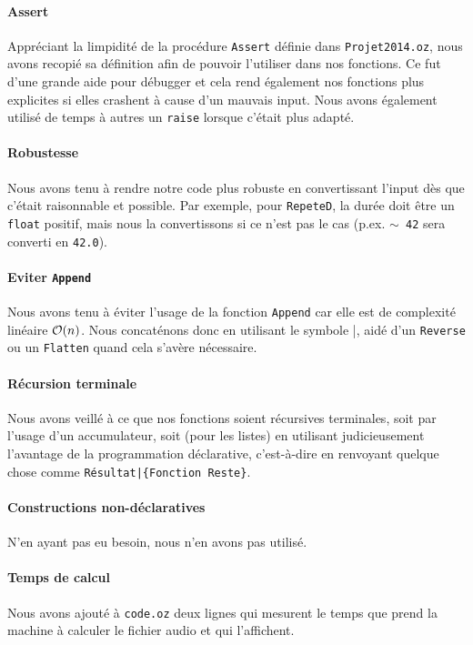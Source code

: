 \documentclass[a4paper,oneside,10pt]{article}
\newcommand{\fun}[1]{\texttt{#1}}
\newcommand{\bigO}[1]{$\mathcal{O(\text{$ #1 $})}$}
\begin{document}
\paragraph{Assert}
Appréciant la limpidité de la procédure \fun{Assert} définie dans \fun{Projet2014.oz}, nous avons recopié sa définition afin de pouvoir l'utiliser dans nos fonctions. Ce fut d'une grande aide pour débugger et cela rend également nos fonctions plus explicites si elles crashent à cause d'un mauvais input. Nous avons également utilisé de temps à autres un \fun{raise} lorsque c'était plus adapté.

\paragraph{Robustesse}
Nous avons tenu à rendre notre code plus robuste en convertissant l'input dès que c'était raisonnable et possible. Par exemple, pour \fun{RepeteD}, la durée doit être un \fun{float} positif, mais nous la convertissons si ce n'est pas le cas (p.ex. \fun{$\sim$ 42} sera converti en \fun{42.0}).

\paragraph{Eviter \fun{Append}}
Nous avons tenu à éviter l'usage de la fonction \fun{Append} car elle est de complexité linéaire \bigO{n}. Nous concaténons donc en utilisant le symbole |, aidé d'un \fun{Reverse} ou un \fun{Flatten} quand cela s'avère nécessaire.

\paragraph{Récursion terminale}
Nous avons veillé à ce que nos fonctions soient récursives terminales, soit par l'usage d'un accumulateur, soit (pour les listes) en utilisant judicieusement l'avantage de la programmation déclarative, c'est-à-dire en renvoyant quelque chose comme \fun{Résultat|\{Fonction Reste\}}.
	
\paragraph{Constructions non-déclaratives}
N'en ayant pas eu besoin, nous n'en avons pas utilisé.

\paragraph{Temps de calcul}
Nous avons ajouté à \fun{code.oz} deux lignes qui mesurent le temps que prend la machine à calculer le fichier audio et qui l'affichent.
\end{document}
